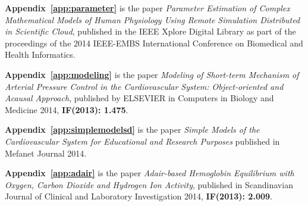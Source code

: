\textbf{Appendix~\ref{app:parameter}} is the paper \cite{Kulhanek2014Parameters} \emph{Parameter Estimation of Complex Mathematical Models of Human Physiology Using Remote Simulation Distributed in Scientific Cloud}, published in the IEEE Xplore Digital Library as part of the proceedings of the 2014 IEEE-EMBS International Conference on Biomedical and Health Informatics.

\textbf{Appendix~\ref{app:modeling}} is the paper \cite{Kulhanek2014Modeling} \emph{Modeling of Short-term Mechanism of Arterial Pressure Control in the Cardiovascular System: Object-oriented and Acausal Approach}, published by ELSEVIER in Computers in Biology and Medicine 2014, \textbf{IF(2013): 1.475}.

\textbf{Appendix~\ref{app:simplemodelsd}} is the paper \cite{Kulhanek2014mefanet} \emph{Simple Models of the Cardiovascular System for Educational and Research Purposes} published in Mefanet Journal 2014.

\textbf{Appendix~\ref{app:adair}} is the paper \cite{Matejak2014sj} \emph{Adair-based Hemoglobin Equilibrium with Oxygen, Carbon Dioxide and Hydrogen Ion Activity}, published in Scandinavian Journal of Clinical and Laboratory Investigation 2014, \textbf{IF(2013): 2.009}.

